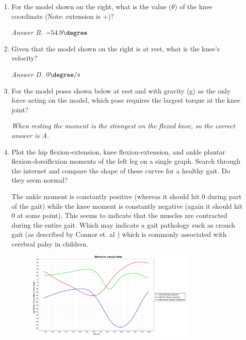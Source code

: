 \documentclass[11pt]{article}
\begin{document}
\begin{enumerate}
\begin{adjustwidth}{0.5cm}{}
    \end{adjustwidth}
    \item For the model shown on the right, what is the value ($\theta$) of the knee coordinate (Note: extension is +)?
    \begin{adjustwidth}{0.5cm}{}
        \textit{Answer B. $-54.9 \degree$}
    \end{adjustwidth}
    \item Given that the model shown on the right is at rest, what is the knee's velocity?
    \begin{adjustwidth}{0.5cm}{}
        \textit{Answer D. $0 \degree / s$}
    \end{adjustwidth}
    \item For the model poses shown below at rest and with gravity (g) as the only force acting on the model, which pose requires the largest torque at the knee joint?
    \begin{adjustwidth}{0.5cm}{}
        \textit{When resting the moment is the strongest on the flexed knee, so the correct answer is A.}
    \end{adjustwidth}
    \item Plot the hip flexion-extension, knee flexion-extension, and ankle plantar flexion-dorsiflexion moments of the left leg on a single graph. Search through the internet and compare the shape of these curves for a healthy gait. Do they seem normal?
    \begin{adjustwidth}{0.5cm}{}
        The ankle moment is constantly positive (whereas it should hit $0$ during part of the gait) while the knee moment is constantly negative (again it should hit $0$ at some point). This seems to indicate that the muscles are contracted during the entire gait. Which may indicate a gait pathology such as crouch gait (as described by Connor et. al \cite{2}) which is commonly associated with cerebral palsy in children.
        \begin{figure}[h!]
            \centering
            \includegraphics[width=0.8\textwidth]{screens/moments_over_time.jpg}

\end{figure}
\end{adjustwidth}
\end{enumerate}
\end{document}
